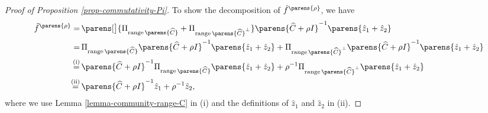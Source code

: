 \begin{proof}[Proof of Proposition \ref{prop-commutativity-Pi}]
	To show the decomposition of $\hat{f}^{\parens{\rho}}$, we have
	\begin{align*}
		\hat{f}^{\parens{\rho}} = & \, \parens[\big]{\Pi_{\range \parens{\widehat{C}}} + \Pi_{\range \parens{\widehat{C}}^{\perp}}} \parens{\widehat{C} + \rho I}^{-1} \parens{\hat{z}_1 + \hat{z}_2} \\ 
		= & \, \Pi_{\range \parens{\widehat{C}}} \parens{\widehat{C} + \rho I}^{-1} \parens{\hat{z}_1 + \hat{z}_2} + \Pi_{\range \parens{\widehat{C}}^{\perp}} \parens{\widehat{C} + \rho I}^{-1} \parens{\hat{z}_1 + \hat{z}_2} \\ 
		\stackrel{\text{(i)}}{=} & \, \parens{\widehat{C} + \rho I}^{-1} \Pi_{\range \parens{\widehat{C}}} \parens{\hat{z}_1 + \hat{z}_2} + \rho^{-1} \Pi_{\range \parens{\widehat{C}}^{\perp}} \parens{\hat{z}_1 + \hat{z}_2} \\ 
		\stackrel{\text{(ii)}}{=} & \, \parens{\widehat{C} + \rho I}^{-1} \hat{z}_1 + \rho^{-1} \hat{z}_2, 
	\end{align*}
	where we use Lemma \ref{lemma-community-range-C} in (i) and the definitions of $\hat{z}_1$ and $\hat{z}_2$ in (ii). 
\end{proof}

